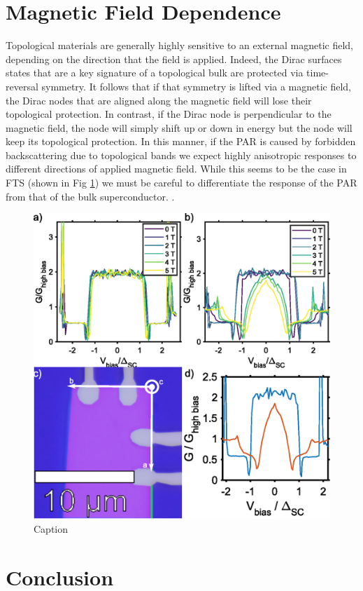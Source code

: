 \section{Magnetic Field Dependence}
Topological materials are generally highly sensitive to an external magnetic field, depending on the direction that the field is applied. Indeed, the Dirac surfaces states that are a key signature of a topological bulk are protected via time-reversal symmetry. It follows that if that symmetry is lifted via a magnetic field, the Dirac nodes that are aligned along the magnetic field will lose their topological protection. In contrast, if the Dirac node is perpendicular to the magnetic field, the node will simply shift up or down in energy but the node will keep its topological protection. In this manner, if the \ac{PAR} is caused by forbidden backscattering due to topological bands we expect highly anisotropic responses to different directions of applied magnetic field. While this seems to be the case in \ac{FTS} (shown in Fig \ref{fig:PARField}) we must be careful to differentiate the response of the \ac{PAR} from that of the bulk superconductor. \cite{zalic2019}.
\begin{figure}
    \centering
    \includegraphics[width = \textwidth]{Chap4/Figures/MagneticField.eps}
    \caption{Caption}
    \label{fig:PARField}
\end{figure}
\section{Conclusion}